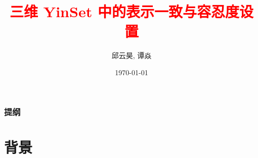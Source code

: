 \documentclass[UTF8]{ctexbeamer}	%
\title{\textcolor{red}{三维 YinSet 中的表示一致与容忍度设置}}
\author{邱云昊, 谭焱 
 }
\date{\today}
\theoremstyle{plain}
\theoremstyle{definition}
\theoremstyle{remark}
\numberwithin{equation}{section}
\begin{document}

\begin{frame}
    \titlepage
\end{frame}


\begin{frame}
    \frametitle{提纲}
    \tableofcontents
\end{frame}

\section{背景}

\end{document}

